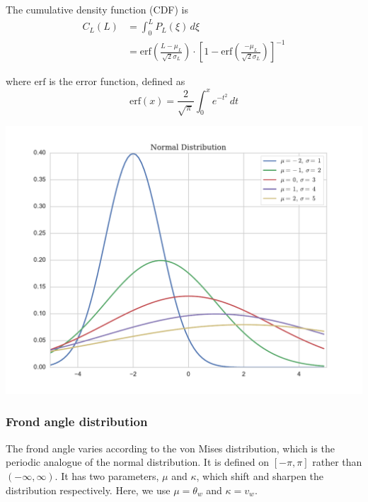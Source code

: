 \documentclass[10pt]{article}
\newenvironment{mcfig}
	{\par\medskip\noindent\minipage{\linewidth}}
	{\endminipage\par\medskip}
\newcommand{\erf}{\mbox{erf}}
\begin{document}
\begin{multicols}{2}
The cumulative density function (CDF) is
\begin{align}
	C_L(L) &= \int_0^L P_L(\xi)\,d\xi  \nonumber \\
	&= \erf\left(\frac{L-\mu_L}{\sqrt{2}\sigma_L}\right)
	\cdot \left[1-\erf \left(\frac{-\mu_L}{\sqrt{2}\sigma_L}\right) \right]^{-1}
\end{align}

where $\erf$ is the error function, defined as 
\begin{equation}
	\erf(x) = \frac{2}{\sqrt{\pi}}\int_0^x e^{-t^2}\,dt
\end{equation}

\begin{mcfig}
	\centering
	\vspace{-1em}
	\includegraphics[width=\linewidth]{normal}
	\vspace{-2em}
	\label{fig:normal}
\end{mcfig}

\subsubsection{Frond angle distribution}
\label{sec:angle_dist}
The frond angle varies according to the von Mises distribution, which is the periodic analogue of the normal distribution.
It is defined on $[-\pi,\pi]$ rather than $(-\infty,\infty)$.
It has two parameters, $\mu$ and $\kappa$, which shift and sharpen the distribution respectively.
Here, we use $\mu = \theta_w$ and $\kappa = v_w$.


\end{multicols}
\end{document}
